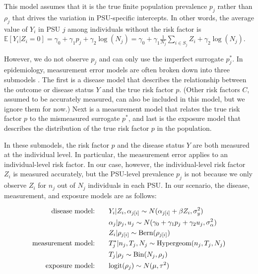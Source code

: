 \documentclass[10pt,a4paper]{article}
\newcommand*{\red}{\textcolor{red}}
\begin{document}
This model assumes that it is the true finite population prevalence $p_j$ rather than $\rho_j$ that drives the variation in PSU-specific intercepts. In other words, the average value of $Y_i$ in PSU $j$ among individuals without the risk factor is $\mathbb{E}[Y_i | Z_i = 0] = \gamma_0 + \gamma_1 p_j + \gamma_2 \log(N_j) = \gamma_0 + \gamma_1 \frac{1}{N_j} \sum_{i \in S_j} Z_i + \gamma_2 \log(N_j)$.



However, we do not observe $p_j$ and can only use the imperfect surrogate $p^*_j$. In epidemiology, measurement error models are often broken down into three submodels \citep{richardson_gilks}. The first is a disease model that describes the relationship between the outcome or disease status $Y$ and the true risk factor $p$. (Other risk factors $C$, assumed to be accurately measured, can also be included in this model, but we ignore them for now.) Next is a measurement model that relates the true risk factor $p$ to the mismeasured surrogate $p^*$, and last is the exposure model that describes the distribution of the true risk factor $p$ in the population.

In these submodels, the risk factor $p$ and the disease status $Y$ are both measured at the individual level. In particular, the measurement error applies to an individual-level risk factor. In our case, however, the individual-level risk factor $Z_i$ is measured accurately, but the PSU-level prevalence $p_j$ is not because we only observe $Z_i$ for $n_j$ out of $N_j$ individuals in each PSU. In our scenario, the disease, measurement, and exposure models are as follows:

\begin{align}
	\textrm{disease model:} \quad \quad &Y_i | Z_i, \alpha_{j[i]} \sim N(\alpha_{j[i]} + \beta Z_i, \sigma_y^2) \label{disease} \\
	&\alpha_j | p_j, u_j \sim N(\gamma_0 + \gamma_1 p_j + \gamma_2 u_j, \sigma_{\alpha}^2) \notag\\
	&Z_i | \rho_{j[i]} \sim \textrm{Bern}(\rho_{j[i]}) \notag\\
	\textrm{measurement model:}\quad \quad	&T^*_j | n_j, T_j, N_j \sim \textrm{Hypergeom}(n_j, T_j, N_j) \label{measurement} \\
	& T_j | \rho_j \sim \textrm{Bin}(N_j, \rho_j) \notag\\
	\textrm{exposure model:} \quad \quad &\textrm{logit}(\rho_j) \sim N(\mu, \tau^2) \label{exposure}
\end{align}
\end{document}

